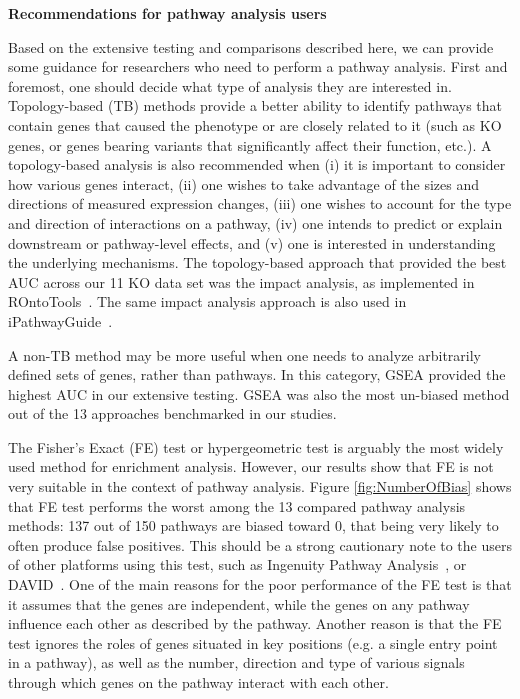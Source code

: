 \textbf{Recommendations for pathway analysis users}

Based on the extensive testing and comparisons described here, we can provide some guidance for researchers who need to perform a pathway analysis. First and foremost, one should decide what type of analysis they are interested in. Topology-based (TB) methods  provide a better ability to identify pathways that contain genes that caused the phenotype or are closely related to it (such as KO genes, or genes bearing variants that significantly affect their function, etc.). A topology-based analysis is also recommended when (i) it is important to consider how various genes interact, (ii) one wishes to take advantage of the sizes and directions of measured expression changes, (iii) one wishes to account for the type and direction of interactions on a pathway, (iv) one intends to predict or explain downstream or pathway-level effects, and (v) one is interested in understanding the underlying mechanisms. The topology-based approach that  provided the best AUC across our 11 KO data set was the impact analysis, as implemented in ROntoTools~\cite{ROntoTools1.2.0}. The same impact analysis approach is also used in  iPathwayGuide~\cite{ahsan2017identifying,Pathway-GuideSoftware}.

A non-TB method may be more useful when one needs to analyze arbitrarily defined sets of genes, rather than pathways. In this category, GSEA provided the highest AUC in our extensive testing. GSEA was also the most un-biased method out of the 13 approaches benchmarked in our studies. 

The Fisher's Exact (FE) test or hypergeometric test is arguably the most widely  used method for enrichment analysis. However,  our results show that FE is not very suitable in the context of pathway analysis. Figure \ref{fig:NumberOfBias} shows that FE test performs the worst among the 13 compared pathway analysis methods:  137 out of 150 pathways are biased toward 0, that being very likely to often produce false positives. This  should be a strong cautionary note to the users of other platforms using this test, such as Ingenuity Pathway Analysis~\cite{kramer2013causal}, or DAVID~\cite{huang2008systematic}.
One of the main reasons for the poor performance of the FE test is that it assumes that the genes are independent, while the genes on any pathway influence each other as described by the pathway. Another reason is that the FE test ignores the roles of genes situated in key positions (e.g. a single entry point in a pathway), as well as the number, direction and type of various signals through which genes on the pathway interact with each other.
